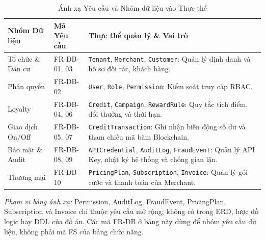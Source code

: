 \vspace{0.3cm}
\begin{table}[H]
    \centering
    \caption{Ánh xạ Yêu cầu và Nhóm dữ liệu vào Thực thể}
    \label{tab:anh_xa_du_lieu}
    \vspace{0.2cm}
    \renewcommand{\arraystretch}{1.3}
    \begin{tabular}{|>{\raggedright\arraybackslash}p{3cm}|>{\raggedright\arraybackslash}p{3cm}|>{\raggedright\arraybackslash}p{8cm}|}
        \hline
        \textbf{Nhóm Dữ liệu} & \textbf{Mã Yêu cầu} & \textbf{Thực thể quản lý \& Vai trò} \\
        \hline
        Tổ chức \& Dân cư & FR-DB-01, 03 & \texttt{Tenant}, \texttt{Merchant}, \texttt{Customer}: Quản lý định danh và hồ sơ đối tác, khách hàng. \\
        \hline
        Phân quyền & FR-DB-02 & \texttt{User}, \texttt{Role}, \texttt{Permission}: Kiểm soát truy cập RBAC. \\
        \hline
        Loyalty & FR-DB-04, 06 & \texttt{Credit}, \texttt{Campaign}, \texttt{RewardRule}: Quy tắc tích điểm, đổi thưởng và thời hạn. \\
        \hline
        Giao dịch On/Off & FR-DB-05, 07 & \texttt{CreditTransaction}: Ghi nhận biến động số dư và tham chiếu mã băm Blockchain. \\
        \hline
        Bảo mật \& Audit & FR-DB-08, 09 & \texttt{APICredential}, \texttt{AuditLog}, \texttt{FraudEvent}: Quản lý API Key, nhật ký hệ thống và chống gian lận. \\
        \hline
        Thương mại & FR-DB-10 & \texttt{PricingPlan}, \texttt{Subscription}, \texttt{Invoice}: Quản lý gói cước và thanh toán của Merchant. \\
        \hline
    \end{tabular}
\end{table}

\textit{Phạm vi bảng ánh xạ:} Permission, AuditLog, FraudEvent, PricingPlan, Subscription và Invoice chỉ thuộc yêu cầu mở rộng; không có trong ERD, lược đồ logic hay DDL của đồ án. Các mã FR-DB ở bảng này dùng để nhóm yêu cầu dữ liệu, không phải mã FS của bảng chức năng.
